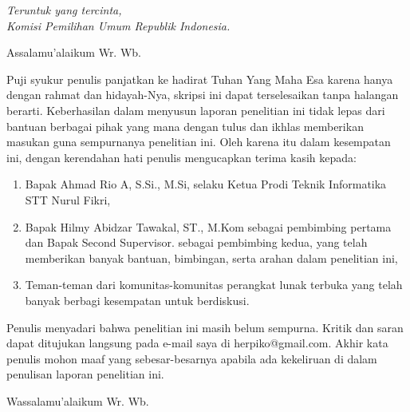 \documentclass{sttnfskripsi}
\begin{document}
\cover

\secondcover

\approvalpage

\noplagiatstatement

\acknowledgment
\begin{flushright}
\emph{Teruntuk yang tercinta,\\ Komisi Pemilihan Umum Republik Indonesia.}
\end{flushright}

\preface
Assalamu'alaikum Wr. Wb.

\vspace{0.5cm}

Puji syukur penulis panjatkan ke hadirat Tuhan Yang Maha Esa karena hanya dengan rahmat dan hidayah-Nya, skripsi ini dapat terselesaikan tanpa halangan berarti. Keberhasilan dalam menyusun laporan penelitian ini tidak lepas dari bantuan berbagai pihak yang mana dengan tulus dan ikhlas memberikan masukan guna sempurnanya penelitian ini. Oleh karena itu dalam kesempatan ini, dengan kerendahan hati penulis mengucapkan terima kasih kepada:

\begin{enumerate}
\item{Bapak Ahmad Rio A, S.Si., M.Si, selaku Ketua Prodi Teknik Informatika STT Nurul Fikri,}
\item{Bapak Hilmy Abidzar Tawakal, ST., M.Kom sebagai pembimbing pertama dan Bapak Second Supervisor. sebagai pembimbing kedua, yang telah memberikan banyak bantuan, bimbingan, serta arahan dalam penelitian ini,}
\item{Teman-teman dari komunitas-komunitas perangkat lunak terbuka yang telah banyak berbagi kesempatan untuk berdiskusi.}
\end{enumerate}

Penulis menyadari bahwa penelitian ini masih belum sempurna. Kritik dan saran dapat ditujukan langsung pada e-mail saya di herpiko@gmail.com. Akhir kata penulis mohon maaf yang sebesar-besarnya apabila ada kekeliruan di dalam penulisan laporan penelitian ini.

\vspace{0.5cm}

Wassalamu'alaikum Wr. Wb.
\end{document}
